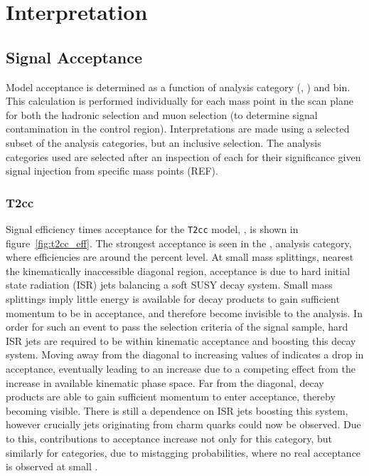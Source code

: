 \chapter{Interpretation}
\label{ch:9}

\ifpdf
    \graphicspath{{Chapter9/Figs/Raster/}{Chapter9/Figs/PDF/}{Chapter9/Figs/}}
\else
    \graphicspath{{Chapter9/Figs/Vector/}{Chapter9/Figs/}}
\fi

\section{Signal Acceptance}  %
\label{sec:interpretation_acceptance}

Model acceptance is determined as a function of analysis category (\nb, \nj) and
\HT bin. This calculation is performed individually for each mass point in the
scan plane for both the hadronic selection and muon selection (to determine 
signal contamination in the control region). Interpretations are made using a
selected subset of the analysis 
categories, but an inclusive \HT selection. The analysis categories used are 
selected after an inspection of each for their significance given signal 
injection from specific mass points (REF).

\subsection{T2cc}
\label{sec:t2cc_eff}
Signal efficiency times acceptance for the \texttt{T2cc} model, \Ttwocc,  is shown in 
figure~\ref{fig:t2cc_eff}. The strongest acceptance is seen in the \njlow, 
 analysis category, where efficiencies are around the percent level. At 
small mass splittings, nearest the kinematically inaccessible diagonal region, 
acceptance is due to hard initial state radiation (ISR) jets balancing a soft 
SUSY decay system. Small mass splittings imply little energy is available for 
decay products to gain sufficient momentum to be in acceptance, and therefore 
become invisible to the analysis. In order for such an event to pass the 
selection criteria of the signal sample, hard ISR jets are required to be within
kinematic acceptance and boosting this decay system. Moving away from the 
diagonal to increasing values of \deltam indicates a drop in acceptance, 
eventually leading to an increase due to a competing effect from the increase in
available kinematic phase space. Far from the diagonal, decay products are able 
to gain sufficient momentum to enter acceptance, thereby becoming visible. There
is still a dependence on ISR jets boosting this system, however crucially jets 
originating from charm quarks could now be observed. Due to this, contributions 
to acceptance increase not only for this  category, but similarly for 
categories, due to mistagging probabilities, where no real acceptance is 
observed at small \deltam.

